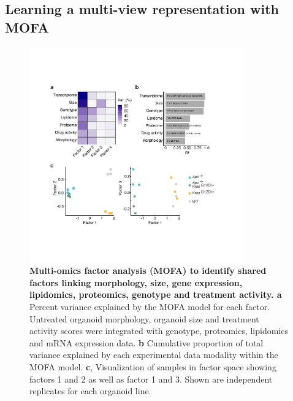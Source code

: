 \begin{flushleft}
\subsection{Learning a multi-view representation with MOFA}

\begin{figure}[h!]
\centering
\includegraphics[width=350,
                height=\textheight,
                keepaspectratio]{figures/adenomaprofiling/pdf/fig_1_7.pdf}
\caption[Multi-omics factor analysis (MOFA) to identify shared factors linking morphology, size, gene expression, lipidomics, proteomics, genotype and treatment activity]{\textbf{Multi-omics factor analysis (MOFA) to identify shared factors linking morphology, size, gene expression, lipidomics, proteomics, genotype and treatment activity. a} Percent variance explained by the MOFA model for each factor. Untreated organoid morphology, organoid size and treatment activity scores were integrated with genotype, proteomics, lipidomics and mRNA expression data. \textbf{b} Cumulative proportion of total variance explained by each experimental data modality within the MOFA model. \textbf{c}, Visualization of samples in factor space showing factors 1 and 2 as well as factor 1 and 3. Shown are independent replicates for each organoid line. 
}
\label{fig_170}
\end{figure}
\bigbreak


\end{flushleft}

